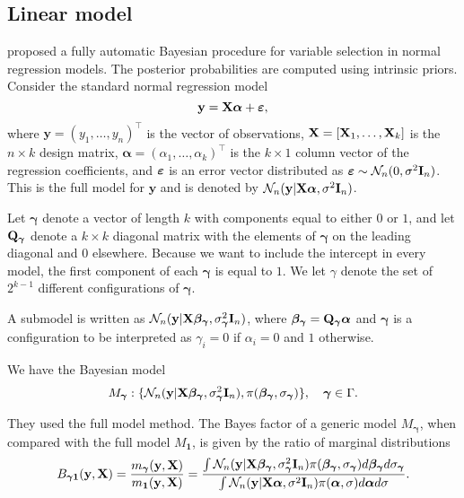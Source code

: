 \documentclass[11pt]{article}
\newcommand{\By}{\mathbf{y}}    \newcommand{\Bz}{\mathbf{z}}
\newcommand{\bfsym}[1]{\ensuremath{\boldsymbol{#1}}}
\def\balpha{\bfsym \alpha}
\def\bbeta{\bfsym \beta}
\def\bgamma{\bfsym \gamma}             \def\bGamma{\bfsym \Gamma}
\theoremstyle{plain}
\theoremstyle{definition}
\theoremstyle{remark}
\begin{document}
\subsection{Linear model}
\cite{Casella2006Obj} proposed a fully automatic Bayesian procedure for variable selection in normal regression models.
The posterior probabilities are computed using intrinsic priors.
Consider the standard normal regression model
\begin{equation*}
    \By=\BX\balpha+\bepsilon,
\end{equation*}
where $\By= (y_1,\ldots, y_n)^\top$ is the vector of observations, $\mathbf{X}=[\mathbf{X}_1,\ldots,\mathbf{X}_k]$ is the $n\times k$ design matrix, $\balpha=(\alpha_1,\ldots, \alpha_k)^\top$ is the $k \times 1$ column vector of the regression coefficients, and $\bepsilon$ is an error vector distributed as $\bepsilon\sim \mathcal N_n(0,\sigma^2 \BI_n)$.
This is the full model for $\By$ and is denoted by $\mathcal N_n (\By | \BX \balpha, \sigma^2 \BI_n)$.

Let $\bgamma$ denote a vector of length $k$ with components equal to either $0$ or $1$, and let $\BQ_{\bgamma}$ denote a $k\times k$ diagonal matrix with the elements of $\bgamma$ on the leading diagonal and $0$ elsewhere.
Because we want to include the intercept in every model, the first component of each $\bgamma$ is equal to $1$. 
We let $\gamma$ denote the set of $2^{k-1}$ different configurations of $\bgamma$.

A submodel is written as $\mathcal N_n (\By| \BX \bbeta_{\bgamma}, \sigma^2_{\bgamma} \BI_n)$, where $\bbeta_{\bgamma} =\BQ_{\bgamma} \balpha$ and $\bgamma$ is a configuration to be interpreted as $\gamma_i=0$ if $\alpha_i=0$ and $1$ otherwise.

We have the Bayesian model
\begin{equation*}
    M_{\bgamma} : \{\mathcal N_n (\By | \BX \bbeta_{\bgamma}, \sigma^2_{\bgamma} \BI_n), \pi(\bbeta_{\bgamma}, \sigma_{\bgamma}) \}, \quad \bgamma \in \Gamma.
\end{equation*}


They used the full model method.
The Bayes factor of a generic model $M_{\bgamma}$, when compared with the full model $M_{\mathbf 1}$, is given by  the ratio of marginal distributions
\begin{equation*}
    B_{\bgamma \mathbf 1} (\By, \BX)=
    \frac{m_{\bgamma} (\By, \BX)}{m_{\mathbf 1}(\By, \BX)}
    =\frac{
        \int\mathcal N_n (\By | \BX \bbeta_{\bgamma}, \sigma^2_{\bgamma} \BI_n)
        \pi(\bbeta_{\bgamma}, \sigma_{\bgamma})
        d \bbeta_{\bgamma} d \sigma_{\bgamma}
    }{
        \int\mathcal N_n (\By | \BX \balpha, \sigma^2 \BI_n)
        \pi(\balpha, \sigma)
        d \balpha d \sigma
    }.
\end{equation*}
\end{document}
